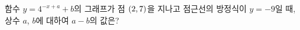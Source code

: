 함수 $y=4^{-x+a}+b$의 그래프가 점 $(2{,}\mkern3mu\mathopen{}7)$을 지나고 점근선의 방정식이 $y=-9$일 때, 상수 $a$, $b$에 대하여 $a-b$의 값은?
